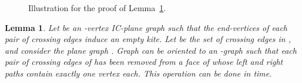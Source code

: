 \documentclass[a4paper]{article}
\newtheorem{lemma}{Lemma}
\begin{document}
\begin{figure}[t]
\centering
{}\hfil
{}\hfil
{}\hfil
{}
\caption{\small Illustration for the proof of Lemma~\ref{le:st-orientation}.}
\end{figure}

\begin{lemma}\label{le:st-orientation}
Let  be an -vertex IC-plane graph such that the end-vertices of each pair of crossing edges induce an empty kite. Let  be the set of crossing edges in , and consider the plane graph . Graph  can be oriented to an -graph such that each pair of crossing edges of  has been removed from a face of  whose left and right paths contain exactly one vertex each. This operation can be done in  time.
\end{lemma}
\end{document}
